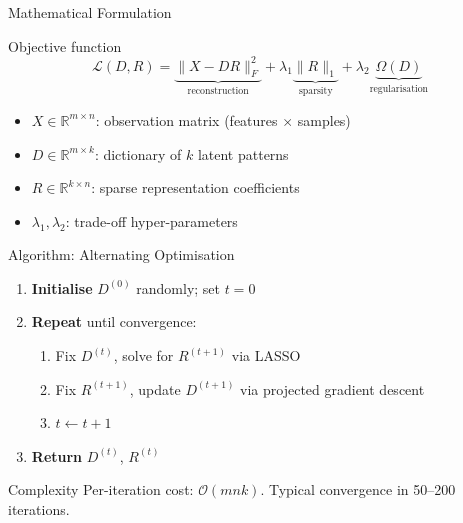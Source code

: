 \documentclass{beamer}
\begin{document}
\begin{frame}{Mathematical Formulation}
    \begin{block}{Objective function}
        \[
        \mathcal{L}(D,R)=\underbrace{\|X - DR\|_F^2}_{\text{reconstruction}}
        +\lambda_1 \underbrace{\|R\|_1}_{\text{sparsity}}
        +\lambda_2 \underbrace{\Omega(D)}_{\text{regularisation}}
        \]
    \end{block}
    \vspace{0.2cm}
    \begin{itemize}
        \setlength{\itemsep}{0.5em}
        \item \(X \in \mathbb{R}^{m \times n}\): observation matrix (features \(\times\) samples)
        \item \(D \in \mathbb{R}^{m \times k}\): dictionary of \(k\) latent patterns
        \item \(R \in \mathbb{R}^{k \times n}\): sparse representation coefficients
        \item \(\lambda_1, \lambda_2\): trade-off hyper-parameters
    \end{itemize}
\end{frame}

\begin{frame}{Algorithm: Alternating Optimisation}
    \begin{enumerate}
        \setlength{\itemsep}{0.7em}
        \item \textcolor{AccentBlue}{\textbf{Initialise}} \(D^{(0)}\) randomly; set \(t=0\)
        \item \textcolor{AccentBlue}{\textbf{Repeat}} until convergence:
        \begin{enumerate}
            \item Fix \(D^{(t)}\), solve for \(R^{(t+1)}\) via LASSO
            \item Fix \(R^{(t+1)}\), update \(D^{(t+1)}\) via projected gradient descent
            \item \(t \leftarrow t + 1\)
        \end{enumerate}
        \item \textcolor{AccentBlue}{\textbf{Return}} \(D^{(t)}\), \(R^{(t)}\)
    \end{enumerate}
    \vspace{0.3cm}
    \begin{alertblock}{Complexity}
        Per-iteration cost: \(\mathcal{O}(mnk)\). Typical convergence in 50--200 iterations.
    \end{alertblock}
\end{frame}
\end{document}
